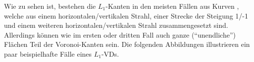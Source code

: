 \documentclass[a4paper]{article}
\begin{document}
Wie zu sehen ist, bestehen die $L_1$-Kanten in den meisten Fällen aus Kurven , welche aus einem horizontalen/vertikalen Strahl, einer Strecke der Steigung 1/-1 und einem weiteren horizontalen/vertikalen Strahl zusammengesetzt sind. Allerdings können wie im ersten oder dritten Fall 
auch ganze ("`unendliche"') Flächen Teil der Voronoi-Kanten sein. Die folgenden Abbildungen illustrieren
ein paar beispielhafte Fälle eines $L_1$-VDs.


\begin{figure} [htbp] 

\end{figure}
\end{document}
